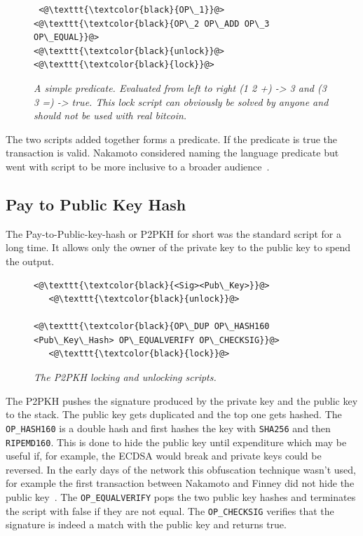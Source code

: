 \begin{figure}[!hbt]
		\centering
	\begin{lstlisting}
 <@\texttt{\textcolor{black}{OP\_1}}@>   <@\texttt{\textcolor{black}{OP\_2 OP\_ADD OP\_3 OP\_EQUAL}}@>
<@\texttt{\textcolor{black}{unlock}}@>           <@\texttt{\textcolor{black}{lock}}@>
	\end{lstlisting}
	
	\caption{\textit{ A simple predicate. Evaluated from left to right (1 2 +) -> 3 and
			(3 3 =) -> true. This lock script can obviously be solved by anyone and should not be used with real bitcoin.
	}}
	\label{fig:simple:script}
\end{figure}

The two scripts added together forms a predicate. If the predicate is true the transaction is valid. Nakamoto considered naming the language predicate but went with script to be more inclusive to a broader audience~\cite{nakamoto:predicate}.

\subsection{Pay to Public Key Hash}

The Pay-to-Public-key-hash or P2PKH for short was the standard script for a long time. It allows only the owner of 
the private key to the public key to spend the output.

\begin{figure}[!hbt]
		\centering
	\begin{lstlisting}
<@\texttt{\textcolor{black}{<Sig><Pub\_Key>}}@>   
   <@\texttt{\textcolor{black}{unlock}}@>
   
<@\texttt{\textcolor{black}{OP\_DUP OP\_HASH160 <Pub\_Key\_Hash> OP\_EQUALVERIFY OP\_CHECKSIG}}@>
   <@\texttt{\textcolor{black}{lock}}@>
	\end{lstlisting}
	
	\caption{\textit{ The P2PKH locking and unlocking scripts.
	}}
	\label{fig:P2PKH}
\end{figure}

The P2PKH pushes the signature produced by the private key and the public key to the stack. The public key gets duplicated and the top one gets hashed. The \texttt{OP\_HASH160} is a double hash and first hashes the key with \texttt{SHA256} and then \texttt{RIPEMD160}. This is done to hide the public key until expenditure which may be useful if, for example, the ECDSA would break and private keys could be reversed. In the early days of the network this obfuscation technique wasn't used, for example the first transaction between Nakamoto and Finney did not hide the public key~\cite{nakamoto:finney:tx}. The \texttt{OP\_EQUALVERIFY} pops the two public key hashes and terminates the script with false if they are not equal. The \texttt{OP\_CHECKSIG} verifies that the signature is indeed a match with the public key and returns true. 

